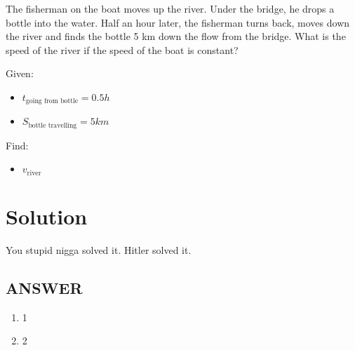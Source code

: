 The fisherman on the boat moves up the river. Under the bridge, he drops a bottle into the water.
Half an hour later, the fisherman turns back, moves down the river and finds the bottle 5 km
down the flow from the bridge. What is the speed of the river if the speed of the boat is constant?

\bigbreak Given: \begin{itemize}
    \item $t_{\text{going from bottle}} = 0.5h$
    \item $S_{\text{bottle travelling}} = 5km$
\end{itemize}

Find: \begin{itemize}
    \item $v_{\text{river}}$
\end{itemize}

\section*{Solution}

You stupid nigga solved it. Hitler solved it. 

\vfill
\subsection*{ANSWER}
\begin{enumerate}
    \item 1
    \item 2
\end{enumerate}

